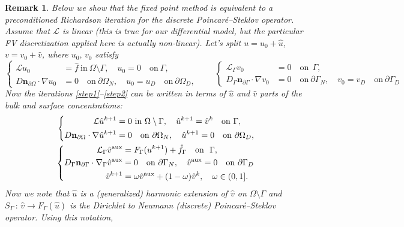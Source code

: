 \documentclass{article}
\newtheorem{remark}{Remark}[section]
\newcommand{\bn}{\mathbf n}
\newcommand{\cL}{\mathcal L}
\def\dO{{\partial\Omega} }
\def\dG{{\partial\Gamma} }
\begin{document}
\begin{remark}\rm \label{rem1} {Below we show that the fixed point method is equivalent to a preconditioned Richardson iteration for the discrete Poincar\'{e}--Steklov operator. Assume that $\cL$ is linear (this is true for our differential model, but
the particular FV discretization applied here is actually non-linear).
Let's} split $u=u_0+\hat{u}$, $v=v_0+\hat{v}$, where $u_0,\,v_0$ satisfy
\[
\left\{
\begin{aligned}
\cL u_0&= \hat{f}~\text{in}~ \Omega\setminus\Gamma,\quad u_0=0 \quad \text{on}~ \Gamma,\\
 D\bn_\dO\cdot\nabla u_0&=0 \quad \text{on}~ \dO_N,\quad u_0=u_D \quad \text{on}~ \dO_D,
  \end{aligned}
\right.\qquad
\left\{
\begin{aligned}
 \cL_\Gamma {v}_0&=  0  \quad \text{on}~~\Gamma,\\
 D_\Gamma\bn_\dG\cdot\nabla {v}_0&=0 \quad \text{on}~ \dG_N,\quad {v}_0=v_D \quad \text{on}~ \dG_D
 \end{aligned}
\right.
\]
Now the iterations \eqref{step1}--\eqref{step2} can be written in terms of  $\hat{u}$ and $\hat{v}$ parts of the bulk and surface  concentrations:
\begin{equation} \label{step1a}
\begin{split}
\left\{
\begin{aligned}
 \cL \hat{u}^{k+1}&= 0~\text{in}~ \Omega\setminus\Gamma,\quad \hat{u}^{k+1}=\hat{v}^{k} \quad \text{on}~ \Gamma,\\
 {D}\bn_\dO\cdot\nabla \hat{u}^{k+1}&=0 \quad \text{on}~ \dO_N,\quad \hat{u}^{k+1}=0 \quad \text{on}~ \dO_D,\\
 \end{aligned}
\right. \\
\left\{
\begin{aligned}
 \cL_\Gamma \hat{v}^{\rm aux}&=  F_\Gamma(u^{k+1})+ \hat{f}_\Gamma  \quad \text{on}~~\Gamma,\\
 {D}_\Gamma\bn_\dG\cdot\nabla_\Gamma \hat{v}^{\rm aux}&=0 \quad \text{on}~ \dG_N,\quad \hat{v}^{\rm aux}=0 \quad \text{on}~ \dG_D\\
 \hat{v}^{k+1}&=\omega\hat{v}^{\rm aux}+(1-\omega) \hat{v}^{k},\quad \omega\in(0,1].
 \end{aligned}
\right.
\end{split}
\end{equation}
Now we note that $\hat{u}$ is a (generalized) harmonic extension of $\hat{v}$  on $\Omega\setminus\Gamma$ and $S_\Gamma\,:\,\hat{v}\to F_\Gamma(\hat{u})$ is the  Dirichlet to Neumann (discrete) Poincar\'{e}--Steklov operator. Using this notation,

\end{remark}
\end{document}
